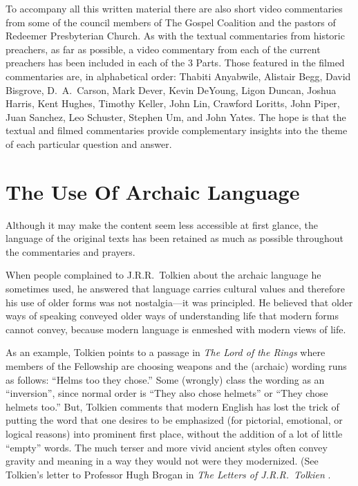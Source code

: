 \documentclass[00-main.tex]{subfiles}
\begin{document}
To accompany all this written material there are also short video commentaries from some of the council members of The Gospel Coalition and the pastors of Redeemer Presbyterian Church. As with the textual commentaries from historic preachers, as far as possible, a video commentary from each of the current preachers has been included in each of the 3 Parts. Those featured in the filmed commentaries are, in alphabetical order: Thabiti Anyabwile, Alistair Begg, David Bisgrove, D.~A.\ Carson, Mark Dever, Kevin DeYoung, Ligon Duncan, Joshua Harris, Kent Hughes, Timothy Keller, John Lin, Crawford Loritts, John Piper, Juan Sanchez, Leo Schuster, Stephen Um, and John Yates. The hope is that the textual and filmed commentaries provide complementary insights into the theme of each particular question and answer.

\section{The Use Of Archaic Language}
Although it may make the content seem less accessible at first glance, the language of the original texts has been retained as much as possible throughout the commentaries and prayers.

When people complained to J.R.R.~Tolkien about the archaic language he sometimes used, he answered that language carries cultural values and therefore his use of older forms was not nostalgia\thinspace{}---\thinspace{}it was principled. He believed that older ways of speaking conveyed older ways of understanding life that modern forms cannot convey, because modern language is enmeshed with modern views of life.

As an example, Tolkien points to a passage in \emph{The Lord of the Rings} where members of the Fellowship are choosing weapons and the (archaic) wording runs as follows: ``Helms too they chose.'' Some (wrongly) class the wording as an ``inversion'', since normal order is ``They also chose helmets'' or ``They chose helmets too.'' But, Tolkien comments that modern English has lost the trick of putting the word that one desires to be emphasized (for pictorial, emotional, or logical reasons) into prominent first place, without the addition of a lot of little ``empty'' words. The much terser and more vivid ancient styles often convey gravity and meaning in a way they would not were they modernized. (See Tolkien's letter to Professor Hugh Brogan in \emph{The Letters of J.R.R.\ Tolkien} \cite{Tolkien:1981}.
\end{document}
